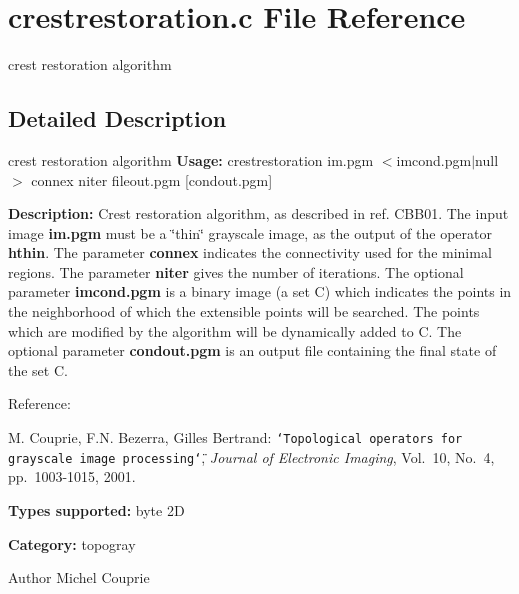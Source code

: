 \section{crestrestoration.c File Reference}
\label{crestrestoration_8c}


crest restoration algorithm  




\subsection{Detailed Description}
crest restoration algorithm {\bfseries Usage:} crestrestoration im.pgm $<$imcond.pgm$|$null$>$ connex niter fileout.pgm [condout.pgm]

{\bfseries Description:} Crest restoration algorithm, as described in ref. CBB01. The input image {\bfseries im.pgm} must be a \char`\"{}thin\char`\"{} grayscale image, as the output of the operator {\bfseries hthin}. The parameter {\bfseries connex} indicates the connectivity used for the minimal regions. The parameter {\bfseries niter} gives the number of iterations. The optional parameter {\bfseries imcond.pgm} is a binary image (a set C) which indicates the points in the neighborhood of which the extensible points will be searched. The points which are modified by the algorithm will be dynamically added to C. The optional parameter {\bfseries condout.pgm} is an output file containing the final state of the set C.

Reference:\par
 [CBB01] M. Couprie, F.N. Bezerra, Gilles Bertrand: {\tt \char`\"{}Topological operators for
grayscale image processing\char`\"{}}, {\itshape  Journal of Electronic Imaging\/}, Vol.~10, No.~4, pp.~1003-\/1015, 2001.

{\bfseries Types supported:} byte 2D

{\bfseries Category:} topogray

\begin{DoxyAuthor}{Author}
Michel Couprie 
\end{DoxyAuthor}
